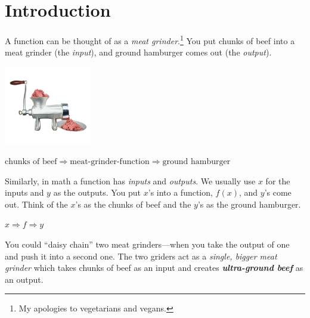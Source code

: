 \section*{Introduction}

A function can be thought of as a \emph{meat grinder}.\footnote{
    My apologies to vegetarians and vegans.
}
You put chunks of beef into a meat grinder (the \emph{input}),
and ground hamburger comes out (the \emph{output}). 

\begin{center}
\includegraphics[width=1.5in]{../../common/images/meat-grinder.png} 
\end{center}

\begin{center}
\(
    \text{chunks of beef}
    \Longrightarrow
    \text{meat-grinder-function}
    \Longrightarrow
    \text{ground hamburger}
\)
\end{center}

Similarly,
in math a function has \emph{inputs} and \emph{outputs}.
We usually use $x$ for the inputs and $y$ as the outputs.
You put $x$'s into a function, $f(x)$,
and $y$'s come out.
Think of the $x$'s as the chunks of beef
and the $y$'s as the ground hamburger.
\begin{center}
\(
    x
    \Longrightarrow
    f
    \Longrightarrow
    y
\)
\end{center}

You could ``daisy chain'' two meat grinders---when 
you take the output of one and push it into
a second one.
The two griders act as a  
\emph{single, bigger meat grinder} which takes chunks of beef
as an input and creates 
{\bfseries\itshape ultra-ground beef} as an output.

